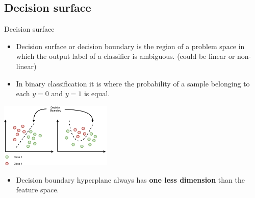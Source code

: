 \documentclass[serif, aspectratio=169]{beamer}
\begin{document}
\subsection{Decision surface}
\begin{frame}{Decision surface}
    \begin{itemize}
      \item Decision surface or decision boundary is the region of a problem space in which the output label of a classifier is ambiguous. (could be linear or non-linear)
      \item In binary classification it is where the probability of a sample belonging to each $y=0$ and $y=1$ is equal.
    \end{itemize}
    
    
     \begin{center}
        \includegraphics[width=0.4\textwidth]{pic/decision boundary.png}
    \end{center}
    
    \begin{itemize}
        
      \item Decision boundary hyperplane always has \textbf{one less dimension} than the feature space.
      
      
      
     
    \end{itemize}
\end{frame}
\end{document}
